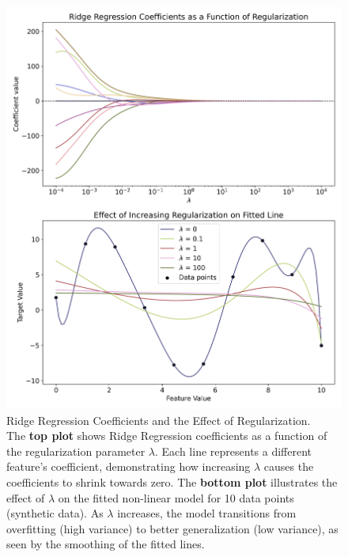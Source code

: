 \documentclass[english,11pt,a4paper,titlepage]{article}
\begin{document}
	\begin{figure}[!t]
		\centering
		\includegraphics[width=1.0\linewidth]{img/ridge_lambda_effect}
		\caption{Ridge Regression Coefficients and the Effect of Regularization. \\ The \textbf{top plot} shows Ridge Regression coefficients as a function of the regularization parameter $\lambda$. Each line represents a different feature's coefficient, demonstrating how increasing $\lambda$ causes the coefficients to shrink towards zero. The \textbf{bottom plot} illustrates the effect of $\lambda$ on the fitted non-linear model for 10 data points (synthetic data). As $\lambda$ increases, the model transitions from overfitting (high variance) to better generalization (low variance), as seen by the smoothing of the fitted lines.}
		\label{fig:ridgelambdaeffect}
	\end{figure}
	\clearpage
	
\end{document}
